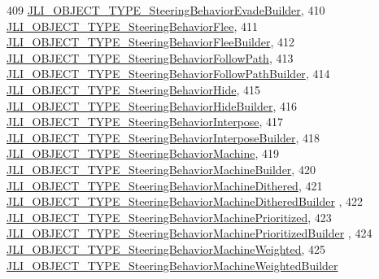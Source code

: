\begin{DoxyCode}
409     \mbox{\hyperlink{namespacenjli_a6d56d4fbaf89fcf3e3d32839df05b444a0017bece3b05aaca5de3a0178d4c183a}{JLI\_OBJECT\_TYPE\_SteeringBehaviorEvadeBuilder}},
410     \mbox{\hyperlink{namespacenjli_a6d56d4fbaf89fcf3e3d32839df05b444ad8f55b1005e041f03a207f3681934f3e}{JLI\_OBJECT\_TYPE\_SteeringBehaviorFlee}},
411     \mbox{\hyperlink{namespacenjli_a6d56d4fbaf89fcf3e3d32839df05b444a38dbdf18105275cdc40705d292043cae}{JLI\_OBJECT\_TYPE\_SteeringBehaviorFleeBuilder}},
412     \mbox{\hyperlink{namespacenjli_a6d56d4fbaf89fcf3e3d32839df05b444a962c0bb9b5505d9b35ea4e0a2787b8fc}{JLI\_OBJECT\_TYPE\_SteeringBehaviorFollowPath}},
413     \mbox{\hyperlink{namespacenjli_a6d56d4fbaf89fcf3e3d32839df05b444a466c76db47db8b5c31a0072e355d46ea}{JLI\_OBJECT\_TYPE\_SteeringBehaviorFollowPathBuilder}},
414     \mbox{\hyperlink{namespacenjli_a6d56d4fbaf89fcf3e3d32839df05b444a8c33b85812fff3133ea671c7ed10db94}{JLI\_OBJECT\_TYPE\_SteeringBehaviorHide}},
415     \mbox{\hyperlink{namespacenjli_a6d56d4fbaf89fcf3e3d32839df05b444a570ae3260203dd9c759c46ccdaebe1a2}{JLI\_OBJECT\_TYPE\_SteeringBehaviorHideBuilder}},
416     \mbox{\hyperlink{namespacenjli_a6d56d4fbaf89fcf3e3d32839df05b444aff0e49c53b9391645f902c423f286665}{JLI\_OBJECT\_TYPE\_SteeringBehaviorInterpose}},
417     \mbox{\hyperlink{namespacenjli_a6d56d4fbaf89fcf3e3d32839df05b444af61186785348e8a45b867976b5427ed6}{JLI\_OBJECT\_TYPE\_SteeringBehaviorInterposeBuilder}},
418     \mbox{\hyperlink{namespacenjli_a6d56d4fbaf89fcf3e3d32839df05b444a817bec1230cf61d85cde086e80971d25}{JLI\_OBJECT\_TYPE\_SteeringBehaviorMachine}},
419     \mbox{\hyperlink{namespacenjli_a6d56d4fbaf89fcf3e3d32839df05b444aff0448d58179523ec1b7b7c1542ce8d9}{JLI\_OBJECT\_TYPE\_SteeringBehaviorMachineBuilder}},
420     \mbox{\hyperlink{namespacenjli_a6d56d4fbaf89fcf3e3d32839df05b444ac77dededa73b417607c942ec991ce045}{JLI\_OBJECT\_TYPE\_SteeringBehaviorMachineDithered}},
421     \mbox{\hyperlink{namespacenjli_a6d56d4fbaf89fcf3e3d32839df05b444ad1cb2a434e28d6aacaed539768cfea58}{JLI\_OBJECT\_TYPE\_SteeringBehaviorMachineDitheredBuilder}}
      ,
422     \mbox{\hyperlink{namespacenjli_a6d56d4fbaf89fcf3e3d32839df05b444a9276f434de93792934f0d7af6fa41597}{JLI\_OBJECT\_TYPE\_SteeringBehaviorMachinePrioritized}},
423     \mbox{\hyperlink{namespacenjli_a6d56d4fbaf89fcf3e3d32839df05b444a68d4c35aa5b0285b647cfe17dd8cba4a}{JLI\_OBJECT\_TYPE\_SteeringBehaviorMachinePrioritizedBuilder}}
      ,
424     \mbox{\hyperlink{namespacenjli_a6d56d4fbaf89fcf3e3d32839df05b444ae4d04019caa0d5dc392200c1e78ce8b9}{JLI\_OBJECT\_TYPE\_SteeringBehaviorMachineWeighted}},
425     \mbox{\hyperlink{namespacenjli_a6d56d4fbaf89fcf3e3d32839df05b444aee26265d84971c058fc5ec438ce925d3}{JLI\_OBJECT\_TYPE\_SteeringBehaviorMachineWeightedBuilder}}

\end{DoxyCode}

